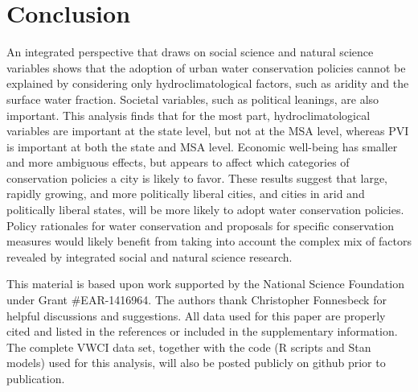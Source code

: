 \documentclass[draft,linenumbers]{agujournal}\usepackage{knitr}
\begin{document}
\section{Conclusion}
An integrated perspective that draws on social science and natural science variables shows that the adoption of urban water conservation policies cannot be explained by considering only hydroclimatological factors, such as aridity and the surface water fraction. Societal variables, such as political leanings, are also important. This analysis finds that for the most part, hydroclimatological variables are important at the state level, but not at the MSA level, whereas PVI is important at both the state and MSA level.
Economic well-being has smaller and more ambiguous effects, but appears to affect which categories of conservation policies a city is likely to favor.
These results suggest that large, rapidly growing, and more politically liberal cities, and cities in arid and politically liberal states, will be more likely to adopt water conservation policies.
Policy rationales for water conservation and proposals for specific conservation measures would likely benefit from taking into account the complex mix of factors revealed by integrated social and natural science research.


\acknowledgments
This material is based upon work supported by the National Science Foundation under Grant \#EAR-1416964.
The authors thank Christopher Fonnesbeck for helpful discussions and suggestions.
All data used for this paper are properly cited and listed in the references or included in the supplementary information. The complete VWCI data set, together with the code (R scripts and Stan models) used for this analysis, will also be posted publicly on github prior to publication.
%

\end{document}
